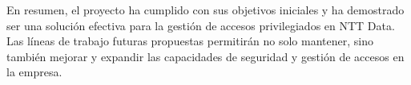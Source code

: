 En resumen, el proyecto ha cumplido con sus objetivos iniciales y ha demostrado ser una solución efectiva para la gestión de accesos privilegiados en NTT Data. Las líneas de trabajo futuras propuestas permitirán no solo mantener, sino también mejorar y expandir las capacidades de seguridad y gestión de accesos en la empresa.

